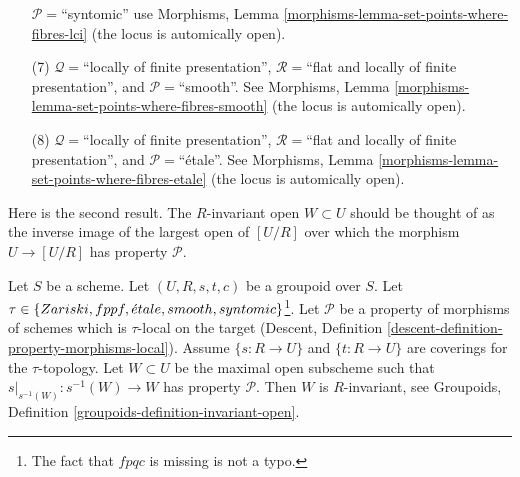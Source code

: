 \begin{remark}
\begin{enumerate}
$\mathcal{P}=$``syntomic'' use
Morphisms, Lemma \ref{morphisms-lemma-set-points-where-fibres-lci}
(the locus is automically open).
\item[(7)] $\mathcal{Q} =$``locally of finite presentation'',
$\mathcal{R} =$``flat and locally of finite presentation'', and
$\mathcal{P}=$``smooth''. See
Morphisms, Lemma \ref{morphisms-lemma-set-points-where-fibres-smooth}
(the locus is automically open).
\item[(8)] $\mathcal{Q} =$``locally of finite presentation'',
$\mathcal{R} =$``flat and locally of finite presentation'', and
$\mathcal{P}=$``\'etale''. See
Morphisms, Lemma \ref{morphisms-lemma-set-points-where-fibres-etale}
(the locus is automically open).
\end{enumerate}
\end{remark}

\noindent
Here is the second result. The $R$-invariant open $W \subset U$ should be
thought of as the inverse image of the largest open of $[U/R]$ over which
the morphism $U \to [U/R]$ has property $\mathcal{P}$.

\begin{lemma}
\label{lemma-property-invariant}
Let $S$ be a scheme.
Let $(U, R, s, t, c)$ be a groupoid over $S$.
Let $\tau \in \{Zariski,\linebreak[0] fppf,
\linebreak[0] \acute{e}tale,\linebreak[0]
smooth,\linebreak[0] syntomic\}$\footnote{The fact that $fpqc$ is missing
is not a typo.}. Let $\mathcal{P}$ be a property of morphisms of schemes
which is $\tau$-local on the target
(Descent, Definition \ref{descent-definition-property-morphisms-local}).
Assume $\{s : R \to U\}$ and $\{t : R \to U\}$ are coverings for the
$\tau$-topology. Let $W \subset U$ be the maximal open subscheme such that
$s|_{s^{-1}(W)} : s^{-1}(W) \to W$ has property $\mathcal{P}$.
Then $W$ is $R$-invariant, see
Groupoids, Definition \ref{groupoids-definition-invariant-open}.
\end{lemma}

